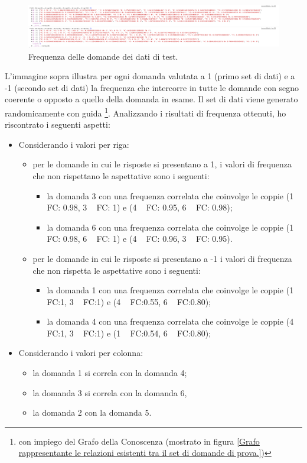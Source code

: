 \noindent
\begin{figure}[H]
\centering
	\includegraphics[width=1\linewidth]{./image/res_frequenceMatrix_OSS.png}
	\caption{Frequenza delle domande dei dati di test.}
	\label{Frequenza delle domande dei dati di test.}
\end{figure}

L'immagine sopra illustra per ogni domanda valutata a 1 (primo set di dati) e a -1 (secondo set di dati) la frequenza che intercorre in tutte le domande con segno coerente o opposto a quello della domanda in esame.
Il set di dati viene generato randomicamente con guida \footnote{con impiego del Grafo della Conoscenza (mostrato in figura \ref{Grafo rappresentante le relazioni esistenti tra il set di domande di prova.})}.
Analizzando i risultati di frequenza ottenuti, ho riscontrato i seguenti aspetti:
\begin{itemize}
\item Considerando i valori per riga:
\begin{itemize}
\item per le domande in cui le risposte si presentano a 1, i valori di frequenza che non rispettano le aspettative sono i seguenti:
\begin{itemize}
\item la domanda 3  con una frequenza correlata che coinvolge le coppie (1 ~ FC: 0.98, 3 ~ FC: 1) e (4 ~ FC: 0.95, 6 ~ FC: 0.98);
\item la domanda 6 con una frequenza correlata che coinvolge le coppie (1 ~ FC: 0.98, 6 ~ FC: 1) e (4 ~ FC: 0.96, 3 ~ FC: 0.95).
\end{itemize}
\item per le domande in cui le risposte si presentano a -1 i valori di frequenza che non rispetta le aspettative sono i seguenti:
\begin{itemize}
\item la domanda 1 con una frequenza correlata che coinvolge le coppie (1 ~ FC:1, 3 ~ FC:1) e (4 ~ FC:0.55, 6 ~ FC:0.80);
\item la domanda 4 con una frequenza correlata che coinvolge le coppie (4 ~ FC:1, 3 ~ FC:1) e (1 ~ FC:0.54, 6 ~ FC:0.80);
\end{itemize}
\end{itemize}
\item Considerando i valori per colonna:
\begin{itemize}
\item la domanda 1 si correla con la domanda 4;
\item la domanda 3 si correla con la domanda 6, 
\item la domanda 2 con la domanda 5.
\end{itemize}
\end{itemize}
